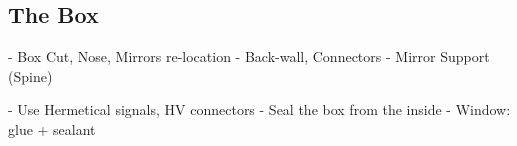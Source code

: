 \subsection{The Box}


- Box Cut, Nose, Mirrors re-location
- Back-wall, Connectors
- Mirror Support (Spine)




- Use Hermetical signals, HV connectors
- Seal the box from the inside
- Window: glue + sealant

